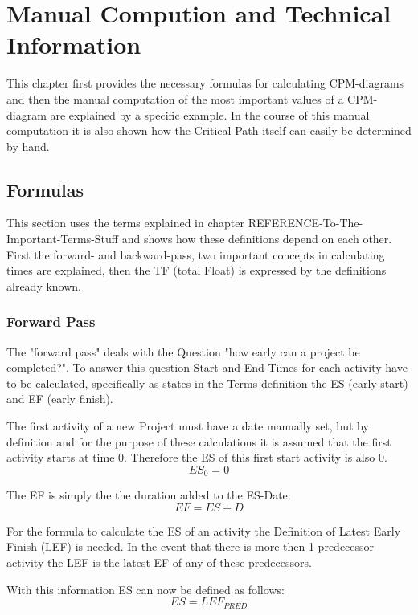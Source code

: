 \section{Manual Compution and Technical Information}

This chapter first provides the necessary formulas for calculating CPM-diagrams and then the manual computation of the most important values of a CPM-diagram are explained by a specific example. In the course of this manual computation it is also shown how the Critical-Path itself can easily be determined by hand.

\subsection{Formulas} \label{formulas}

This section uses the terms explained in chapter REFERENCE-To-The-Important-Terms-Stuff and shows how these definitions depend on each other.
First the forward- and backward-pass, two important concepts in calculating times are explained, then the TF (total Float) is expressed by the definitions already known.
\subsubsection{Forward Pass} \label{forwardPass}
The "forward pass" deals with the Question "how early can a project be completed?". To answer this question Start and End-Times for each activity have to be calculated, specifically as states in the Terms definition the ES (early start) and EF (early finish).

The first activity of a new Project must have a date manually set, but by definition and for the purpose of these calculations it is assumed that the first activity starts at time 0. Therefore the ES of this first start activity is also 0.
\begin{equation}
ES_{0} = 0
\end{equation}

The EF is simply the the duration added to the ES-Date:
\begin{equation}
EF = ES + D
\end{equation}

For the formula to calculate the ES of an activity the Definition of Latest Early Finish (LEF) is needed. In the event that there is more then 1 predecessor activity the LEF is the latest EF of any of these predecessors.

With this information ES can now be defined as follows:
\begin{equation}
ES = LEF_{PRED}
\end{equation}

